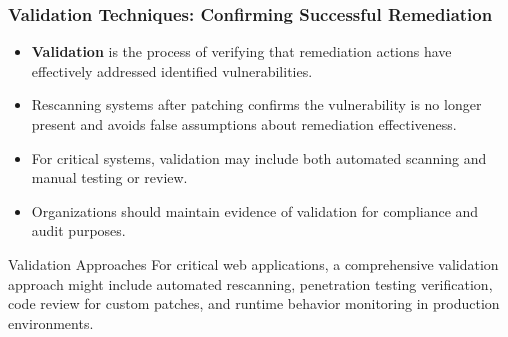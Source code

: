 \documentclass{beamer}
\begin{document}
    \begin{frame}
    \frametitle{Validation Techniques: Confirming Successful Remediation}
    \begin{itemize}
        \item \textbf{Validation} is the process of verifying that remediation actions have effectively addressed identified vulnerabilities.
        \item Rescanning systems after patching confirms the vulnerability is no longer present and avoids false assumptions about remediation effectiveness.
        \item For critical systems, validation may include both automated scanning and manual testing or review.
        \item Organizations should maintain evidence of validation for compliance and audit purposes.
    \end{itemize}
    
    \begin{exampleblock}{Validation Approaches}
    \scriptsize
    For critical web applications, a comprehensive validation approach might include automated rescanning, penetration testing verification, code review for custom patches, and runtime behavior monitoring in production environments.
    \end{exampleblock}
    \end{frame}
    
\end{document}
